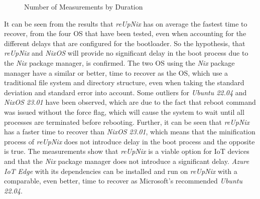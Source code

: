 \begin{figure}[H]
\caption{Number of Measurements by Duration}
\label{fig:timetorecover}
\end{figure}
\noindent
It can be seen from the results that \textit{reUpNix} has on average the fastest time
to recover, from the four \ac{OS} that have been tested, even when accounting for the different
delays that are configured for the bootloader. So the hypothesis, that \textit{reUpNix}
and \textit{NixOS} will provide no significant delay in the boot process due to
the \textit{Nix} package manager, is confirmed. The two \ac{OS} using the
\textit{Nix} package manager have a similar or better, time to recover as the \ac{OS},
which use a traditional file system and directory structure, even when taking
the standard deviation and standard error into account. Some outliers
for \textit{Ubuntu 22.04} and \textit{NixOS 23.01} have been observed, which are due to the
fact that reboot command was issued without the force flag, which will cause
the system to wait until all processes are terminated before rebooting. Further,
it can be seen that \textit{reUpNix} has a faster time to recover than \textit{NixOS 23.01},
which means that the minification process of \textit{reUpNix} does not introduce
delay in the boot process and the opposite is true.
The measurements show that \textit{reUpNix} is a viable option for \ac{IoT} devices
and that the \textit{Nix} package manager does not introduce a significant delay.
\textit{Azure IoT Edge} with its dependencies can be installed and run on
\textit{reUpNix} with a comparable, even better, time to recover as Microsoft's
recommended \textit{Ubuntu 22.04}.


